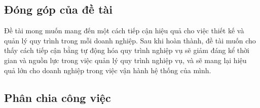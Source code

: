 \subsection{Đóng góp của đề tài}
\hspace{0.5cm} Đề tài mong muốn mang đến một cách tiếp cận hiệu quả cho việc thiết kế và quản lý quy trình trong mỗi doanh nghiệp. Sau khi hoàn thành, đề tài muốn cho thấy cách tiếp cận bằng tự động hóa quy trình nghiệp vụ sẽ giảm đáng kể thời gian và nguồn lực trong việc quản lý quy trình nghiệp vụ, và sẽ mang lại hiệu quả lớn cho doanh nghiệp trong việc vận hành hệ thống của mình.

\subsection{Phân chia công việc}

